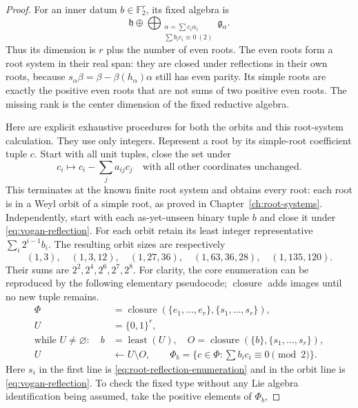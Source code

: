 \begin{proof}
For an inner datum \(b\in\mathbb F_2^r\), its fixed algebra is
\[
 \mathfrak h\oplus
 \bigoplus_{\substack{\alpha=\sum c_i\alpha_i\\
                     \sum b_i c_i\equiv0\ (2)}}\mathfrak g_\alpha.
 \tag{10.2}\label{eq:even-fixed-roots}
\]
Thus its dimension is \(r\) plus the number of even roots.
The even roots form a root system in their real span: they
are closed under reflections in their own roots, because
\(s_\alpha\beta=\beta-\beta(h_\alpha)\alpha\)
still has even parity. Its simple roots are exactly the
positive even roots that are not sums of two positive
even roots. The missing rank is the center dimension of
the fixed reductive algebra.

Here are explicit exhaustive procedures for both the orbits
and this root-system calculation. They use only integers.
Represent a root by its simple-root coefficient tuple \(c\).
Start with all unit tuples, close the set under
\[
 c_i\longmapsto c_i-\sum_j a_{ij}c_j
 \quad\text{with all other coordinates unchanged}.
 \tag{10.3}\label{eq:root-reflection-enumeration}
\]
This terminates at the known finite root system and obtains
every root: each root is in a Weyl orbit of a simple root,
as proved in Chapter~\ref{ch:root-systems}.
Independently, start with each as-yet-unseen binary tuple \(b\)
and close it under \eqref{eq:vogan-reflection}.
For each orbit retain its least integer representative
\(\sum_i2^{i-1}b_i\).
The resulting orbit sizes are respectively
\[
 (1,3),\quad(1,3,12),\quad(1,27,36),\quad
 (1,63,36,28),\quad(1,135,120).
\]
Their sums are \(2^2,2^4,2^6,2^7,2^8\).
For clarity, the core enumeration can be reproduced by
the following elementary pseudocode; \(\operatorname{closure}\)
adds images until no new tuple remains.
\[
\begin{aligned}
 \Phi&=\operatorname{closure}
       (\{e_1,\ldots,e_r\},\{s_1,\ldots,s_r\}),\\
 U&=\{0,1\}^r,\\
 \text{while }U\ne\varnothing:\quad
 b&=\operatorname{least}(U),\quad
 O=\operatorname{closure}(\{b\},\{s_1,\ldots,s_r\}),\\
 U&\leftarrow U\setminus O,\qquad
 \Phi_b=\{c\in\Phi:\sum b_i c_i\equiv0\pmod2\}.
\end{aligned}
\]
Here \(s_i\) in the first line is \eqref{eq:root-reflection-enumeration}
and in the orbit line is \eqref{eq:vogan-reflection}.
To check the fixed type without any Lie algebra identification
being assumed, take the positive elements of \(\Phi_b\),

\end{proof}
